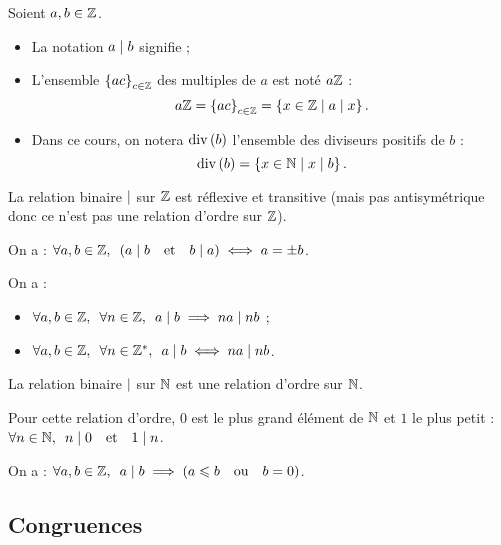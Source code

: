 \begin{nota}
Soient \(a,b\in\mathbb{Z}\).

\begin{itemize}
\item La notation \(a\mid b\) signifie  ;

\item L'ensemble \(\left\lbrace ac\right\rbrace_{c\in\mathbb{Z}}\) des multiples de \(a\) est noté \(a\mathbb{Z}\) : \[a\mathbb{Z}=\left\lbrace ac\right\rbrace_{c\in\mathbb{Z}}=\left\lbrace x\in\mathbb{Z}\;\middle|\; a\mid x\right\rbrace.\]

\item Dans ce cours, on notera \(\operatorname{div}\left(b\right)\) l'ensemble des diviseurs positifs de \(b\) : \[\operatorname{div}\left(b\right)=\left\lbrace x\in\mathbb{N}\;\middle|\; x\mid b\right\rbrace.\]
\end{itemize}
\end{nota}

\begin{prop}
La relation binaire \(\mid\) sur \(\mathbb{Z}\) est réflexive et transitive (mais pas antisymétrique donc ce n'est pas une relation d'ordre sur \(\mathbb{Z}\)).

On a : \(\quantifs{\forall a,b\in\Z}\paren{a\divise b\quad\text{et}\quad b\divise a}\ssi a=\pm b\).

On a : \begin{itemize}
\item \(\quantifs{\forall a,b\in\Z;\forall n\in\Z}a\divise b\imp na\divise nb\) ;

\item \(\quantifs{\forall a,b\in\Z;\forall n\in\Zs}a\divise b\ssi na\divise nb\).
\end{itemize}
\end{prop}

\begin{prop}
La relation binaire \(\mid\) sur \(\mathbb{N}\) est une relation d'ordre sur \(\mathbb{N}\).

Pour cette relation d'ordre, \(0\) est le plus grand élément de \(\mathbb{N}\) et \(1\) le plus petit : \(\quantifs{\forall n\in\N}n\divise0\quad\text{et}\quad1\divise n\).

On a : \(\quantifs{\forall a,b\in\Z}a\divise b\imp\paren{a\leq b\quad\text{ou}\quad b=0}\).
\end{prop}

\subsection{Congruences}

